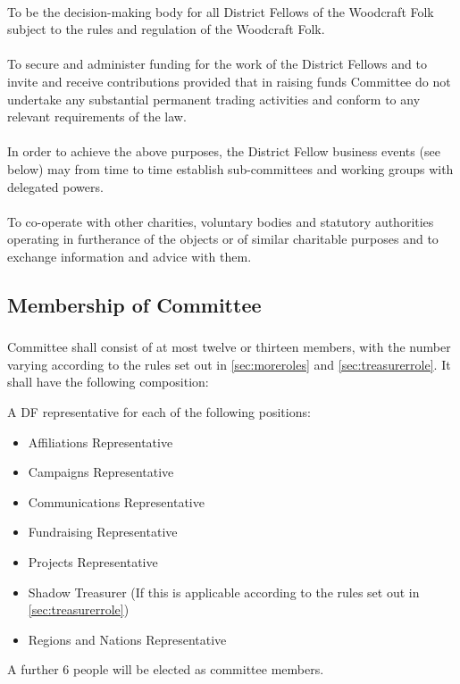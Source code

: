 \documentclass[a4paper, 12pt]{article}
\begin{document}
\paragraph{}
To be the decision-making body for all District Fellows of the Woodcraft Folk subject to the rules and regulation of the Woodcraft Folk.
\paragraph{}
To secure and administer funding for the work of the District Fellows and to invite and receive contributions provided that in raising funds Committee do not undertake any substantial permanent trading activities and conform to any relevant requirements of the law.
\paragraph{}
In order to achieve the above purposes, the District Fellow business events (see below) may from time to time establish sub-committees and working groups with delegated powers.
\paragraph{}
To co-operate with other charities, voluntary bodies and statutory authorities operating in furtherance of the objects or of similar charitable purposes and to exchange information and advice with them.

\subsection{Membership of Committee}
\subsubsection{}
\label{sec:cttemembership}
Committee shall consist of at most twelve or thirteen members, with the number varying according to the rules set out in \ref{sec:moreroles} and \ref{sec:treasurerrole}. It shall have the following composition:

A DF representative for each of the following positions:
\begin{itemize}
\item Affiliations Representative
\item Campaigns Representative
\item Communications Representative
\item Fundraising Representative
\item Projects Representative
\item Shadow Treasurer (If this is applicable according to the rules set out in \ref{sec:treasurerrole})
\item Regions and Nations Representative
\end{itemize}
A further 6 people will be elected as committee members.
\end{document}
